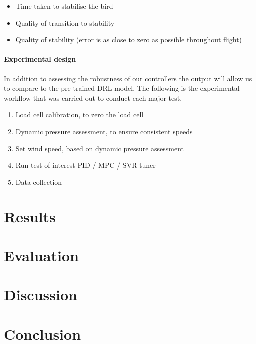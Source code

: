     \begin{itemize}
        \item Time taken to stabilise the bird
        \item Quality of transition to stability
        \item Quality of stability (error is as close to zero as possible throughout flight)
    \end{itemize}

    \paragraph{Experimental design} In addition to assessing the robustness of our controllers the output will
    allow us to compare to the pre-trained DRL model.
    The following is the experimental workflow that was carried out to conduct each major test.

    \begin{enumerate}
        \item Load cell calibration, to zero the load cell
        \item Dynamic pressure assessment, to ensure consistent speeds
        \item Set wind speed, based on dynamic pressure assessment
        \item Run test of interest PID / MPC / SVR tuner
        \item Data collection
    \end{enumerate}

\section{Results}
\section{Evaluation}
\section{Discussion}
\section{Conclusion}
